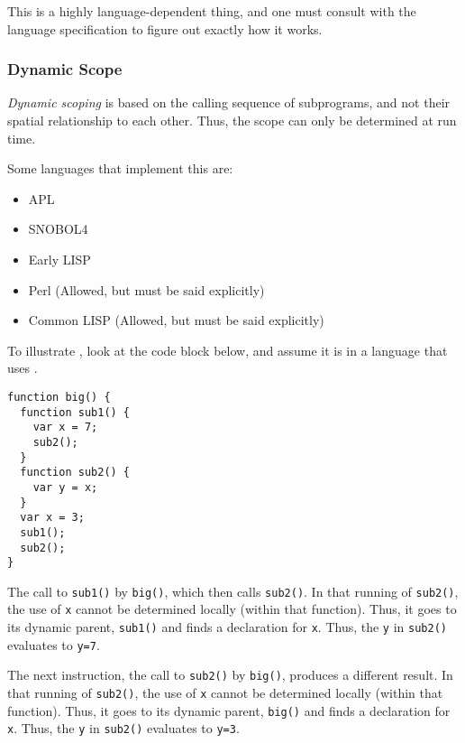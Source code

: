 \begin{remark*}
  This is a highly language-dependent thing, and one must consult with the language specification to figure out exactly how it works.
\end{remark*}

\subsubsection{Dynamic Scope}\label{subsubsec:Dynamic_Scope}
\begin{definition}\label{def:Dynamic_Scoping}
  \emph{Dynamic scoping} is based on the calling sequence of subprograms, and not their spatial relationship to each other.
  Thus, the scope can only be determined at run time.

  Some languages that implement this are:
  \begin{itemize}[noitemsep]
  \item APL
  \item SNOBOL4
  \item Early LISP
  \item Perl (Allowed, but must be said explicitly)
  \item Common LISP (Allowed, but must be said explicitly)
  \end{itemize}
\end{definition}

To illustrate , look at the code block below, and assume it is in a language that uses .
\begin{verbatim}
function big() {
  function sub1() {
    var x = 7;
    sub2();
  }
  function sub2() {
    var y = x;
  }
  var x = 3;
  sub1();
  sub2();
}
\end{verbatim}

The call to \texttt{sub1()} by \texttt{big()}, which then calls \texttt{sub2()}.
In that running of \texttt{sub2()}, the use of \texttt{x} cannot be determined locally (within that function).
Thus, it goes to its dynamic parent, \texttt{sub1()} and finds a declaration for \texttt{x}.
Thus, the \texttt{y} in \texttt{sub2()} evaluates to \texttt{y=7}.

The next instruction, the call to \texttt{sub2()} by \texttt{big()}, produces a different result.
In that running of \texttt{sub2()}, the use of \texttt{x} cannot be determined locally (within that function).
Thus, it goes to its dynamic parent, \texttt{big()} and finds a declaration for \texttt{x}.
Thus, the \texttt{y} in \texttt{sub2()} evaluates to \texttt{y=3}.

